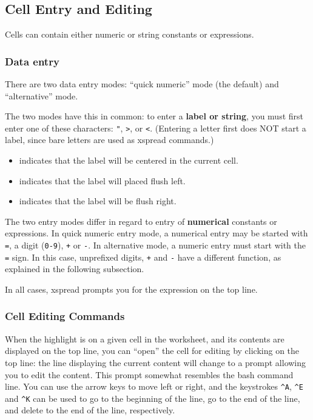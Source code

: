 \documentclass[titlepage]{article}
\newcommand{\titem}[1]{\item[{\tt #1}]}
\newcommand{\ctrl}[1]{\texttt{\^{}#1}}
\begin{document}
\subsection{Cell Entry and Editing}
\label{cellentry}

Cells can contain either numeric or string constants or expressions.

\subsubsection{Data entry}

There are two data entry modes: ``quick numeric'' mode (the default)
and ``alternative'' mode.

The two modes have this in common: to enter a \textbf{label or
  string}, you must first enter one of these characters: \texttt{"},
\verb+>+, or \verb+<+.  (Entering a letter first does NOT start a
label, since bare letters are used as \textsf{xspread} commands.)

\begin{itemize}
\titem{"} indicates that the label will be centered in the
  current cell.
\titem{<} indicates that the label will placed flush left.
\titem{>} indicates that the label will be flush right.
\end{itemize}

The two entry modes differ in regard to entry of \textbf{numerical}
constants or expressions.  In quick numeric entry mode, a numerical
entry may be started with \texttt{=}, a digit (\texttt{0-9}),
\texttt{+} or \texttt{-}.  In alternative mode, a numeric entry must
start with the \texttt{=} sign.  In this case, unprefixed digits,
\texttt{+} and \texttt{-} have a different function, as explained in
the following subsection.

In all cases, \textsf{xspread} prompts you for the expression on the
top line.

\subsubsection{Cell Editing Commands}

When the highlight is on a given cell in the worksheet, and its
contents are displayed on the top line, you can ``open'' the cell for
editing by clicking on the top line: the line displaying the current
content will change to a prompt allowing you to edit the content.
This prompt somewhat resembles the \textsf{bash} command line.  You
can use the arrow keys to move left or right, and the keystrokes
\ctrl{A}, \ctrl{E} and \ctrl{K} can be used to go to the beginning of
the line, go to the end of the line, and delete to the end of the
line, respectively.
\end{document}
